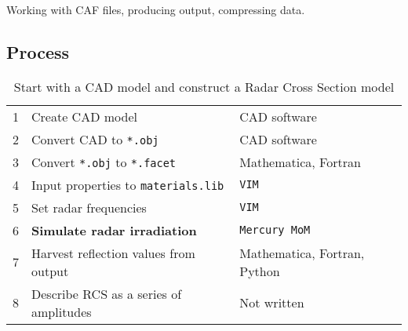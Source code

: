\autocite{topa20200303}
\parencite{topa20200303}
Working with CAF files, producing output, compressing data.
\cite{topa-4-20-2024}
\textcite{topa-4-20-2024}


\subsection{Process}
\begin{table}[htp]
\begin{center}
\begin{tabular}{lll}
	1 & Create CAD model	& CAD software \\
	2 & Convert CAD to \texttt{*.obj}	& CAD software \\
	3 & Convert \texttt{*.obj} to \texttt{*.facet} & Mathematica, Fortran \\
	4 & Input  properties to \texttt{materials.lib}	& \texttt{VIM} \\
	5 & Set radar frequencies & \texttt{VIM} \\
	6 & \bf{Simulate radar irradiation} & \texttt{Mercury MoM} \\
	7 & Harvest reflection values from output & Mathematica, Fortran, Python \\
	8 & Describe RCS as a series of amplitudes & Not written
\end{tabular}
\end{center}
\caption{Start with a CAD model and construct a Radar Cross Section model}
\label{tab:process}
\end{table}%



\endinput  %
